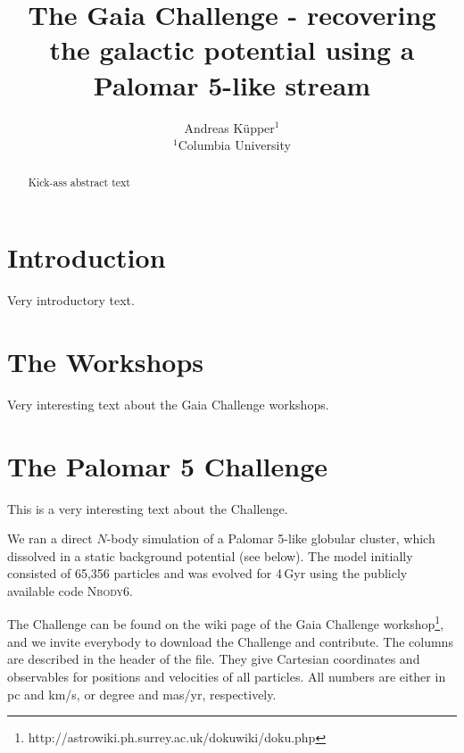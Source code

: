 \documentclass{mn2e}
\title[The Gaia Challenge - recovering the galactic potential using a Palomar
5-like stream]{The Gaia Challenge - recovering the galactic potential using a Palomar
5-like stream}
\author[Andreas K{\"{u}}pper]{Andreas K{\"{u}}pper$^{1}$\\
$^{1}$Columbia University
}
\begin{document}


\maketitle

\label{firstpage}

\begin{abstract}
Kick-ass abstract text

\end{abstract}












\section{Introduction}
Very introductory text.

\section{The Workshops}

Very interesting text about the Gaia Challenge workshops.

\section{The Palomar 5 Challenge}
This is a very interesting text about the Challenge.

We ran a direct $N$-body simulation of a Palomar 5-like globular cluster, which dissolved in a static background potential (see below). The model initially consisted of 65,356 particles and was evolved for 4\,Gyr using the publicly available code \textsc{Nbody6}. 

The Challenge can be found on the wiki page of the Gaia Challenge workshop\footnote{http://astrowiki.ph.surrey.ac.uk/dokuwiki/doku.php}, and we invite everybody to download the Challenge and contribute. The columns are described in the header of the file. They give Cartesian coordinates and observables for positions and velocities of all particles. All numbers are either in pc and km/s, or degree and mas/yr, respectively. 
\end{document}
